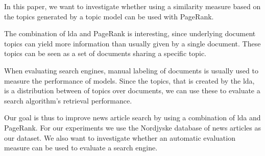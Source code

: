 In this paper, we want to investigate whether using a similarity measure based on the topics generated by a topic model can be used with PageRank.

The combination of \gls{lda} and PageRank is interesting, since underlying document topics can yield more information than usually given by a single document.
These topics can be seen as a set of documents sharing a specific topic. 

When evaluating search engines, manual labeling of documents is usually used to measure the performance of models\cite{yang2009topic}\cite{Tang2008}.
Since the topics, that is created by the \gls{lda}, is a distribution between of topics over documents, we can use these to evaluate a search algorithm's retrieval performance. 

Our goal is thus to improve news article search by using a combination of \gls{lda} and PageRank.
For our experiments we use the Nordjyske database of news articles as our dataset.
We also want to investigate whether an automatic evaluation measure can be used to evaluate a search engine. 




